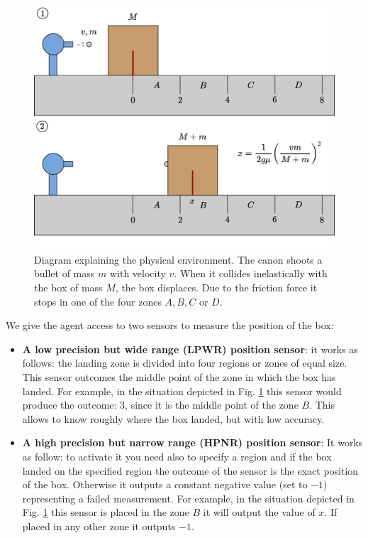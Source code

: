\documentclass[11pt,a4paper,twoside]{report}
\newcommand{\+}{\textnormal{+} }
\theoremstyle{definition}
\numberwithin{equation}{chapter}
\begin{document}
\begin{figure}[t]
  \centering
  \includegraphics[scale=0.5]{figures/Experiment2.pdf}
  \caption{Diagram explaining the physical environment. The canon shoots a 
  bullet of mass $m$ with velocity $v$. When it collides inelastically with the 
  box of mass $M$, the box displaces. Due to the friction force it stops in
  one of the four zones $A, B, C$ or $D$.}
  \label{fig:Box}
\end{figure}

We give the agent access to two sensors to measure the position of the box:
\begin{itemize}
\item \textbf{A low precision but wide range (LPWR) position  sensor}: it works
as follows: the landing zone is divided into four regions or zones of equal size.
This sensor outcomes the middle point of the zone in which the box has landed.
For example, in the situation depicted in Fig. \ref{fig:Box} this sensor would
produce the outcome: $3$, since it is the middle point of the zone $B$. This
allows to know roughly where the box landed, but with low accuracy. 
\item \textbf{A high precision but narrow range (HPNR) position sensor}: It
works as follow: to activate it you need also to specify a region and if the box
landed on the specified region the outcome of the sensor is the exact position
of the box. Otherwise it outputs a constant negative value (set to $-1$)
representing a failed measurement. For example, in the situation depicted in
Fig. \ref{fig:Box} this sensor is placed in the zone $B$ it will output the
value of $x$. If placed in any other zone it outputs $-1$.
\end{itemize}
\end{document}
